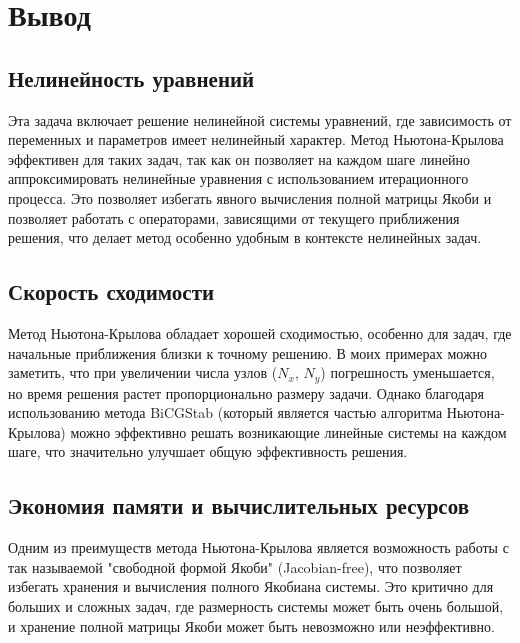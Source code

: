 \documentclass[12pt]{amsart}
\begin{document}
\section{Вывод}

\subsection{Нелинейность уравнений}
Эта задача включает решение нелинейной системы уравнений, где зависимость от переменных и параметров имеет нелинейный характер. Метод Ньютона-Крылова эффективен для таких задач, так как он позволяет на каждом шаге линейно аппроксимировать нелинейные уравнения с использованием итерационного процесса. Это позволяет избегать явного вычисления полной матрицы Якоби и позволяет работать с операторами, зависящими от текущего приближения решения, что делает метод особенно удобным в контексте нелинейных задач.

\subsection{Скорость сходимости}
Метод Ньютона-Крылова обладает хорошей сходимостью, особенно для задач, где начальные приближения близки к точному решению. В моих примерах можно заметить, что при увеличении числа узлов ($N_x$, $N_y$) погрешность уменьшается, но время решения растет пропорционально размеру задачи. Однако благодаря использованию метода BiCGStab (который является частью алгоритма Ньютона-Крылова) можно эффективно решать возникающие линейные системы на каждом шаге, что значительно улучшает общую эффективность решения.

\subsection{Экономия памяти и вычислительных ресурсов}
Одним из преимуществ метода Ньютона-Крылова является возможность работы с так называемой "свободной формой Якоби" (Jacobian-free), что позволяет избегать хранения и вычисления полного Якобиана системы. Это критично для больших и сложных задач, где размерность системы может быть очень большой, и хранение полной матрицы Якоби может быть невозможно или неэффективно.


\vskip 30pt
\end{document}
